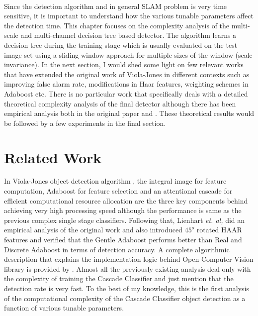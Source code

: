 \paragraph{}
Since the detection algorithm and in general SLAM problem is very time sensitive, it is important to understand how the various tunable parameters affect the detection time. This chapter focuses on the complexity analysis of the multi-scale and multi-channel decision tree based detector. The algorithm learns a decision tree during the training stage which is usually evaluated on the test image set using a sliding window approach for multiple sizes of the window (scale invariance). In the next section, I would shed some light on few relevant works that have extended the original work of Viola-Jones in different contexts such as improving false alarm rate, modifications in Haar features, weighting schemes in Adaboost etc. There is no particular work that specifically deals with a detailed theoretical complexity analysis of the final detector although there has been empirical analysis both in the original paper \cite{violajones} and \cite{classifier4}. These theoretical results would be followed by a few experiments in the final section.

\section{Related Work}
In Viola-Jones object detection algorithm \cite{violajones}, the integral image for feature computation, Adaboost for feature selection and an attentional cascade for efficient computational resource allocation are the three key components behind achieving very high processing speed although the performance is same as the previous complex single stage classifiers. Following that, Lienhart \textit{et. al,} \cite{classifier4} did an empirical analysis of the original work and also introduced $45^{o}$ rotated HAAR features and verified that the Gentle Adaboost performs better than Real and Discrete Adaboost in terms of detection accuracy. A complete algorithmic description that explains the implementation logic behind Open Computer Vision library \cite{classifier14} is provided by \cite{classifier13}. Almost all the previously existing analysis deal only with the complexity of training the Cascade Classifier and just mention that the detection rate is very fast. To the best of my knowledge, this is the first analysis of the computational complexity of the Cascade Classifier object detection as a function of various tunable parameters.

